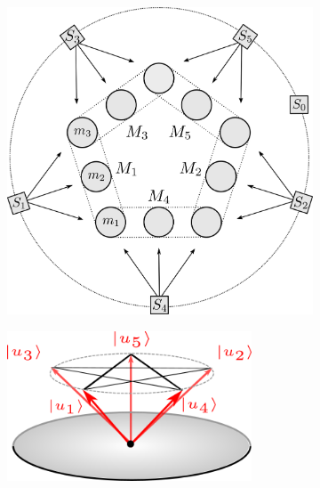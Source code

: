 \begin{figure}
	\begin{subfigure}[t]{0.45\textwidth}
    	\centering
    	\includegraphics[width=\textwidth]{images/kcbsspekkens.png}
        \caption{}
	\end{subfigure}
	\hfill
    \begin{subfigure}[t]{0.45\textwidth}
    	\centering 
        \includegraphics[width=0.8\textwidth]{images/kcbsrefstates.png}
        \caption{}
    \end{subfigure}

\end{figure}

